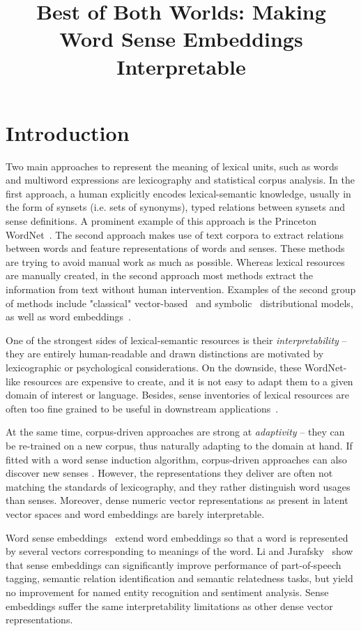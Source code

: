 \documentclass[10pt, a4paper]{article}
\title{Best of Both Worlds: Making Word Sense Embeddings Interpretable}
\begin{document}
\maketitleabstract

\section{Introduction}

 
Two main approaches to represent the meaning of lexical units, such as words and multiword expressions are lexico\-graphy and statistical corpus analysis. In the first approach, a human explicitly encodes lexical-semantic knowledge, usually in the form of synsets (i.e. sets of synonyms),
typed relations between synsets and sense definitions. A prominent example of this approach is the Princeton WordNet~\cite{miller1995wordnet}. The second approach makes use of text corpora to extract relations between words and feature representations of words and senses. These methods are trying to avoid manual work as much as possible. Whereas lexical resources are manually created, in the second approach most methods extract the information from text without human intervention. Examples of the second group of methods include "classical" vector-based~\cite{baroni2010distributional} and symbolic~\cite{Biemann2013} distributional models, as well as word embeddings~\cite{mikolov2013efficient,pennington2014glove}.

One of the strongest sides of lexical-semantic resources is their \textit{interpretability} -- they are entirely human-readable and drawn distinctions are motivated by lexicographic or psychological considerations. On the downside,  these WordNet-like resources are expensive to create, and it is not easy to adapt them to a given domain of interest or language. Besides, sense inventories of lexical resources are often too fine grained to be useful in downstream applications~\cite{brown2008choosing}.

At the same time, corpus-driven approaches are strong at \textit{adaptivity} -- they can be re-trained on a new corpus, thus naturally adapting to the domain at hand. If fitted with a word sense induction algorithm, corpus-driven approaches can also discover new senses \cite{erkEtAl2009}. However, the representations they deliver are often not matching the standards of lexicography, and they rather distinguish word usages than senses. Moreover, dense numeric vector representations as present in latent vector spaces \cite{Schutze1998} and word embeddings are barely interpretable.

Word sense embeddings~\cite{Huang2012,tianEtAl2014,neelakantanefficient} extend word embeddings so that a word is represented by several vectors corresponding to meanings of the word. Li and Jurafsky~ show that sense embeddings can significantly improve performance of part-of-speech tagging, semantic relation identification and semantic relatedness tasks, but yield no improvement for named entity recognition and sentiment analysis. Sense embeddings suffer the same interpretability limitations as other dense vector representations.  
\end{document}
